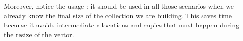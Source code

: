 Moreover, notice the usage : it should be used in all those scenarios when we already know the final size of the collection we are building.
This saves time because it avoids intermediate allocations and copies that must happen during the resize of the vector.








